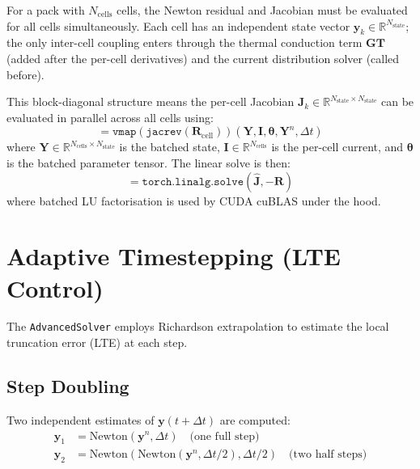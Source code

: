 For a pack with $N_\text{cells}$ cells, the Newton residual and Jacobian must be evaluated for all cells simultaneously. Each cell has an independent state vector $\mathbf{y}_k \in \mathbb{R}^{N_\text{state}}$; the only inter-cell coupling enters through the thermal conduction term $\boldsymbol{G}\boldsymbol{T}$ (added after the per-cell derivatives) and the current distribution solver (called before).

This block-diagonal structure means the per-cell Jacobian $\mathbf{J}_k \in \mathbb{R}^{N_\text{state}\times N_\text{state}}$ can be evaluated in parallel across all cells using:
\begin{equation}
  [\mathbf{J}_1, \mathbf{J}_2, \ldots, \mathbf{J}_{N_\text{cells}}] = \texttt{vmap}(\texttt{jacrev}(\mathbf{R}_\text{cell}))(\mathbf{Y}, \mathbf{I}, \boldsymbol{\theta}, \mathbf{Y}^n, \Delta t)
  \label{eq:vmap_jacobian}
\end{equation}
where $\mathbf{Y} \in \mathbb{R}^{N_\text{cells} \times N_\text{state}}$ is the batched state, $\mathbf{I} \in \mathbb{R}^{N_\text{cells}}$ is the per-cell current, and $\boldsymbol{\theta}$ is the batched parameter tensor. The linear solve is then:
\begin{equation}
  [\boldsymbol{\delta y}_1, \ldots, \boldsymbol{\delta y}_{N_\text{cells}}] = \texttt{torch.linalg.solve}(\hat{\mathbf{J}}, -\mathbf{R})
  \label{eq:batched_solve}
\end{equation}
where batched LU factorisation is used by CUDA cuBLAS under the hood.

\section{Adaptive Timestepping (LTE Control)}
\label{sec:adaptive_dt}

The \texttt{AdvancedSolver} employs Richardson extrapolation to estimate the local truncation error (LTE) at each step.

\subsection{Step Doubling}

Two independent estimates of $\mathbf{y}(t + \Delta t)$ are computed:
\begin{align}
  \mathbf{y}_1 &= \text{Newton}(\mathbf{y}^n, \Delta t) \quad\text{(one full step)} \label{eq:step_full}\\
  \mathbf{y}_2 &= \text{Newton}(\text{Newton}(\mathbf{y}^n, \Delta t/2), \Delta t/2) \quad\text{(two half steps)} \label{eq:step_double}
\end{align}

